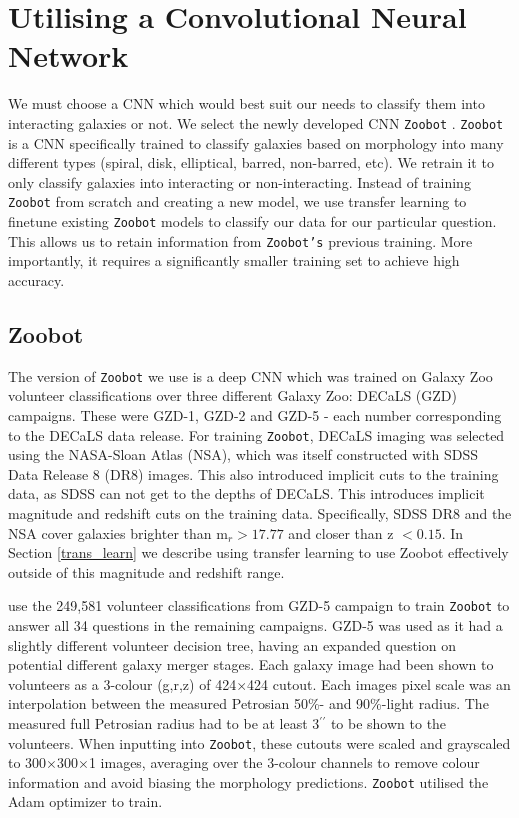 \section{Utilising a Convolutional Neural Network}\label{CNNs}
\noindent We must choose a CNN which would best suit our needs to classify them into interacting galaxies or not. We select the newly developed CNN \texttt{Zoobot} \citep{2022MNRAS.509.3966W, 2023JOSS....8.5312W}. \texttt{Zoobot} is a CNN specifically trained to classify galaxies based on morphology into many different types (spiral, disk, elliptical, barred, non-barred, etc). We retrain it to only classify galaxies into interacting or non-interacting. Instead of training \texttt{Zoobot} from scratch and creating a new model, we use transfer learning to finetune existing \texttt{Zoobot} models to classify our data for our particular question. This allows us to retain information from \texttt{Zoobot's} previous training. More importantly, it requires a significantly smaller training set to achieve high accuracy.

\subsection{Zoobot}
\noindent The version of \texttt{Zoobot} we use is a deep CNN which was trained on Galaxy Zoo volunteer classifications over three different Galaxy Zoo: DECaLS (GZD)\citep[Dark Energy Camera Legacy Survey, described in][]{2019AJ....157..168D} campaigns. These were GZD-1, GZD-2 and GZD-5 - each number corresponding to the DECaLS data release. For training \texttt{Zoobot}, DECaLS imaging was selected using the NASA-Sloan Atlas (NSA), which was itself constructed with SDSS Data Release 8 (DR8) images. This also introduced implicit cuts to the training data, as SDSS can not get to the depths of DECaLS. This introduces implicit magnitude and redshift cuts on the training data. Specifically, SDSS DR8 and the NSA cover galaxies brighter than m$_r > 17.77$ and closer than z $< 0.15$. In Section \ref{trans_learn} we describe using transfer learning to use Zoobot effectively outside of this magnitude and redshift range.

\citet{2022MNRAS.509.3966W} use the 249,581 volunteer classifications from GZD-5 campaign to train \texttt{Zoobot} to answer all 34 questions \citep[example shown in Figure 4 of][]{2022MNRAS.509.3966W} in the remaining campaigns. GZD-5 was used as it had a slightly different volunteer decision tree, having an expanded question on potential different galaxy merger stages. Each galaxy image had been shown to volunteers as a 3-colour (g,r,z) of 424$\times$424 cutout. Each images pixel scale was an interpolation between the measured Petrosian 50\%- and 90\%-light radius. The measured full Petrosian radius had to be at least 3$^{\prime\prime}$ to be shown to the volunteers. When inputting into \texttt{Zoobot}, these cutouts were scaled and grayscaled to 300$\times$300$\times$1 images, averaging over the 3-colour channels to remove colour information and avoid biasing the morphology predictions. \texttt{Zoobot} utilised the Adam \citep{2014arXiv1412.6980K} optimizer to train.

